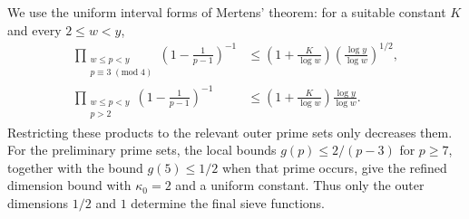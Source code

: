 
We use the uniform interval forms of Mertens' theorem: for a suitable
constant \(K\) and every \(2\leq w<y\),
\begin{align*}
 \prod_{\substack{w\leq p<y\\p\equiv3\; (\mathrm{mod}\;4)}}
 \left(1-\frac1{p-1}\right)^{-1}
 &\leq
 \left(1+\frac K{\log w}\right)
 \left(\frac{\log y}{\log w}\right)^{1/2},\\
 \prod_{\substack{w\leq p<y\\p>2}}
 \left(1-\frac1{p-1}\right)^{-1}
 &\leq
 \left(1+\frac K{\log w}\right)
 \frac{\log y}{\log w}.
\end{align*}
Restricting these products to the relevant outer prime sets only
decreases them. For the preliminary prime sets, the local bounds
\(g(p)\leq2/(p-3)\) for \(p\geq7\), together with the bound
\(g(5)\leq1/2\) when that prime occurs, give the refined dimension
bound with \(\kappa_0=2\) and a uniform constant. Thus only the outer
dimensions \(1/2\) and \(1\) determine the final sieve functions.

